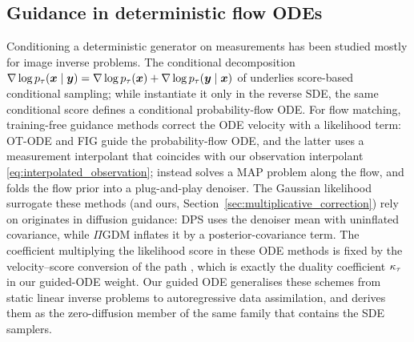 \subsection{Guidance in deterministic flow ODEs}
Conditioning a deterministic generator on measurements has been studied mostly for image inverse problems. The conditional decomposition $\nabla\log p_\tau(\boldsymbol{x}\mid\boldsymbol{y})=\nabla\log p_\tau(\boldsymbol{x})+\nabla\log p_\tau(\boldsymbol{y}\mid\boldsymbol{x})$ of \cite{song_score-based_2021} underlies score-based conditional sampling; while \cite{song_score-based_2021} instantiate it only in the reverse SDE, the same conditional score defines a conditional probability-flow ODE. For flow matching, training-free guidance methods correct the ODE velocity with a likelihood term: OT-ODE \cite{pokle_training-free_2024} and FIG \cite{yan_fig_2024} guide the probability-flow ODE, and the latter uses a measurement interpolant that coincides with our observation interpolant \eqref{eq:interpolated_observation}; \cite{zhang_flow_2025} instead solves a MAP problem along the flow, and \cite{martin_pnp-flow_2025} folds the flow prior into a plug-and-play denoiser. The Gaussian likelihood surrogate these methods (and ours, Section~\ref{sec:multiplicative_correction}) rely on originates in diffusion guidance: DPS \cite{chung_diffusion_2023} uses the denoiser mean with uninflated covariance, while $\Pi$GDM \cite{song_pseudoinverse_2023} inflates it by a posterior-covariance term. The coefficient multiplying the likelihood score in these ODE methods is fixed by the velocity--score conversion of the path \cite{albergo_stochastic_2023, ma_sit_2024}, which is exactly the duality coefficient $\kappa_\tau$ in our guided-ODE weight. Our guided ODE generalises these schemes from static linear inverse problems to autoregressive data assimilation, and derives them as the zero-diffusion member of the same family that contains the SDE samplers.

